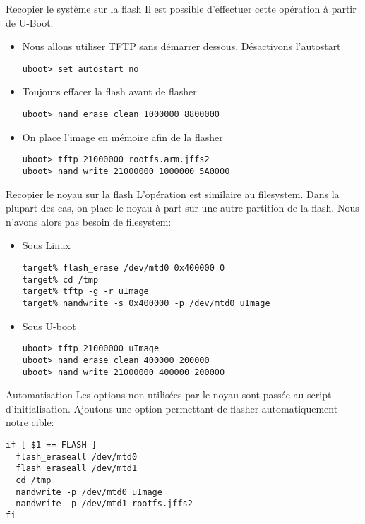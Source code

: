 \begin{frame}[fragile=singleslide]{Recopier le système sur la flash}
  Il est possible d'effectuer cette opération à partir de U-Boot.
  \begin{itemize} 
  \item Nous allons utiliser TFTP sans démarrer dessous. Désactivons l'autostart
    \begin{lstlisting} 
uboot> set autostart no
    \end{lstlisting} 
  \item Toujours effacer la flash avant de flasher
    \begin{lstlisting} 
uboot> nand erase clean 1000000 8800000
    \end{lstlisting} 
  \item On place l'image en mémoire afin de la flasher
    \begin{lstlisting} 
uboot> tftp 21000000 rootfs.arm.jffs2
uboot> nand write 21000000 1000000 5A0000
    \end{lstlisting} 
  \end{itemize}
\end{frame}

\begin{frame}[fragile=singleslide]{Recopier le noyau sur la flash}
  L'opération est similaire au filesystem. Dans la plupart des cas, on
  place le  noyau à  part sur  une autre partition  de la  flash. Nous
  n'avons alors pas besoin de filesystem:
  \begin{itemize} 
  \item Sous Linux
    \begin{lstlisting}
target% flash_erase /dev/mtd0 0x400000 0
target% cd /tmp
target% tftp -g -r uImage
target% nandwrite -s 0x400000 -p /dev/mtd0 uImage 
    \end{lstlisting}
  \item Sous U-boot
    \begin{lstlisting} 
uboot> tftp 21000000 uImage
uboot> nand erase clean 400000 200000
uboot> nand write 21000000 400000 200000
    \end{lstlisting} 
  \end{itemize}
\end{frame}

\begin{frame}[fragile=singleslide]{Automatisation}
  Les  options  non utilisées  par  le  noyau  sont passée  au  script
  d'initialisation.   Ajoutons  une   option  permettant   de  flasher
  automatiquement notre cible:
  \begin{lstlisting}
if [ $1 == FLASH ]
  flash_eraseall /dev/mtd0
  flash_eraseall /dev/mtd1
  cd /tmp
  nandwrite -p /dev/mtd0 uImage
  nandwrite -p /dev/mtd1 rootfs.jffs2
fi
  \end{lstlisting}
\end{frame}

